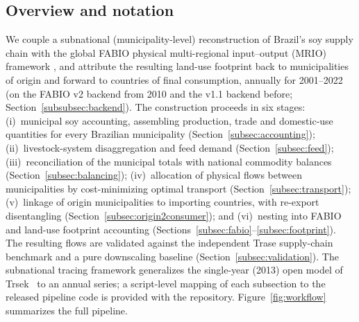 \documentclass[pdflatex,sn-nature]{sn-jnl}%
\begin{document}
\subsection{Overview and notation}\label{subsec:overview}
We couple a subnational (municipality-level) reconstruction of Brazil's soy
supply chain with the global FABIO physical multi-regional
input--output (MRIO) framework \cite{bruckner2019fabio}, and attribute the
resulting land-use footprint back to municipalities of origin and forward to
countries of final consumption, annually for 2001--2022 (on the FABIO v2
backend from 2010 and the v1.1 backend before;
Section~\ref{subsubsec:backend}). The construction
proceeds in six stages: (i)~municipal soy accounting, assembling production,
trade and domestic-use quantities for every Brazilian municipality
(Section~\ref{subsec:accounting}); (ii)~livestock-system disaggregation and
feed demand (Section~\ref{subsec:feed}); (iii)~reconciliation of the municipal
totals with national commodity balances (Section~\ref{subsec:balancing});
(iv)~allocation of physical flows between municipalities by cost-minimizing
optimal transport (Section~\ref{subsec:transport}); (v)~linkage of origin
municipalities to importing countries, with re-export disentangling
(Section~\ref{subsec:origin2consumer}); and (vi)~nesting into FABIO
and land-use footprint accounting
(Sections~\ref{subsec:fabio}--\ref{subsec:footprint}). The resulting flows are
validated against the independent Trase supply-chain benchmark and a
pure downscaling baseline (Section~\ref{subsec:validation}). The subnational
tracing framework generalizes the single-year (2013) open model of
Trsek~\cite{trsek2022} to an annual series; a script-level mapping of each
subsection to the released pipeline code is provided with the repository.
Figure~\ref{fig:workflow} summarizes the full pipeline.
\end{document}

